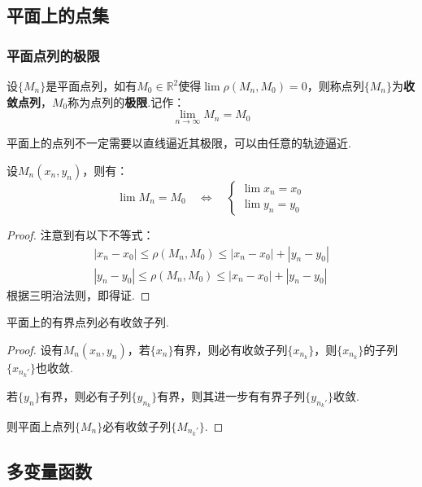 \subsection{平面上的点集}
\subsubsection{平面点列的极限}
\begin{definition}
    设$\{M_n\}$是平面点列，如有$M_0 \in \mathbb{R}^2$使得$\lim \rho(M_n,M_0) = 0$，则称点列$\{M_n\}$为\textbf{收敛点列}，$M_0$称为点列的\textbf{极限}.记作：
    \[\lim_{n \to \infty} M_n  = M_0\]
\end{definition}

平面上的点列不一定需要以直线逼近其极限，可以由任意的轨迹逼近.

\begin{theorem}
    设$M_n(x_n,y_n)$，则有：
    \[\lim M_n = M_0 \quad\Leftrightarrow\quad \begin{cases}
        \lim x_n = x_0 \\
        \lim y_n = y_0
    \end{cases}\]
\end{theorem}

\begin{proof}
    注意到有以下不等式：
    \begin{gather*}
        |x_n-x_0| \leqslant \rho(M_n,M_0) \leqslant |x_n-x_0| + |y_n-y_0| \\
        |y_n-y_0| \leqslant \rho(M_n,M_0) \leqslant |x_n-x_0| + |y_n-y_0|
    \end{gather*}
    根据三明治法则，即得证.
\end{proof}

\begin{theorem}
    \label{thm:2DBolzanoWeierstrass}
    平面上的有界点列必有收敛子列.
\end{theorem}

\begin{proof}
    设有$M_n(x_n,y_n)$，若$\{x_n\}$有界，则必有收敛子列$\{x_{n_k}\}$，则$\{x_{n_k}\}$的子列$\{x_{n_k'}\}$也收敛.

    若$\{y_n\}$有界，则必有子列$\{y_{n_k}\}$有界，则其进一步有有界子列$\{y_{n_k'}\}$收敛.

    则平面上点列$\{M_n\}$必有收敛子列$\{M_{n_k'}\}$.
\end{proof}


\subsection{多变量函数}
